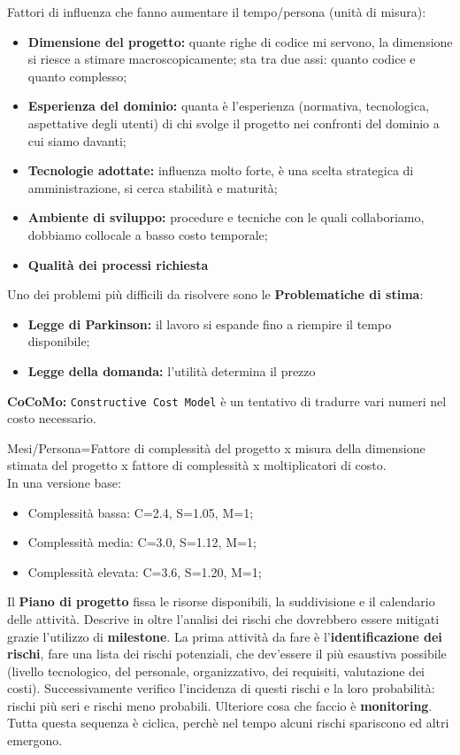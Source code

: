 Fattori di influenza che fanno aumentare il tempo/persona (unità di misura):
\begin{itemize}
	\item \textbf{Dimensione del progetto:} quante righe di codice mi servono, la dimensione si riesce a stimare macroscopicamente; sta tra due assi: quanto codice e quanto complesso;
	\item \textbf{Esperienza del dominio:} quanta è l'esperienza (normativa, tecnologica, aspettative degli utenti) di chi svolge il progetto nei confronti del dominio a cui siamo davanti;
	\item \textbf{Tecnologie adottate:} influenza molto forte, è una scelta strategica di amministrazione, si cerca stabilità e maturità;
	\item \textbf{Ambiente di sviluppo:} procedure e tecniche con le quali collaboriamo, dobbiamo collocale a basso costo temporale;
	\item \textbf{Qualità dei processi richiesta}
\end{itemize}

Uno dei problemi più difficili da risolvere sono le \textbf{Problematiche di stima}:
\begin{itemize}
	\item \textbf{Legge di Parkinson:} il lavoro si espande fino a riempire il tempo disponibile;
	\item \textbf{Legge della domanda:} l'utilità determina il prezzo
\end{itemize}

\textbf{CoCoMo:} \texttt{Constructive Cost Model} è un tentativo di tradurre vari numeri nel costo necessario.\\
\begin{center}
\end{center}
Mesi/Persona=Fattore di complessità del progetto x misura della dimensione stimata del progetto x fattore di complessità x moltiplicatori di costo.
\\
In una versione base:
\begin{itemize}
	\item Complessità bassa: C=2.4, S=1.05, M=1;
	\item Complessità media: C=3.0, S=1.12, M=1;
	\item Complessità elevata: C=3.6, S=1.20, M=1;
\end{itemize}

Il \textbf{Piano di progetto} fissa le risorse disponibili, la suddivisione e il calendario delle attività. Descrive in oltre l'analisi dei rischi che dovrebbero essere mitigati grazie l'utilizzo di \textbf{milestone}.
La prima attività da fare è l'\textbf{identificazione dei rischi}, fare una lista dei rischi potenziali, che dev'essere il più esaustiva possibile (livello tecnologico, del personale, organizzativo, dei requisiti, valutazione dei costi). Successivamente verifico l'incidenza di questi rischi e la loro probabilità: rischi più seri e rischi meno probabili. Ulteriore cosa che faccio è \textbf{monitoring}. Tutta questa sequenza è ciclica, perchè nel tempo alcuni rischi spariscono ed altri emergono.



